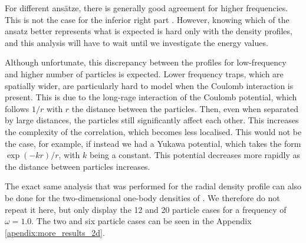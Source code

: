 For different ansätze, there is generally good agreement for higher frequencies. This is not the case for the inferior right part . However, knowing which of the ansatz better represents what is expected is hard only with the density profiles, and this analysis will have to wait until we investigate the energy values.

Although unfortunate, this discrepancy between the profiles for low-frequency and higher number of particles is expected. Lower frequency traps, which are spatially wider, are particularly hard to model when the Coulomb interaction is present. This is due to the long-rage interaction of the Coulomb potential, which follows $1/r$ with $r$ the distance between the particles. Then, even when separated by large distances, the particles still significantly affect each other. This increases the complexity of the correlation, which becomes less localised. This would not be the case, for example, if instead we had a Yukawa potential, which takes the form $\exp(-kr)/r$, with $k$ being a constant. This potential decreases more rapidly as the distance between particles increases.

The exact same analysis that was performed for the radial density profile can also be done for the two-dimensional one-body densities of . We therefore do not repeat it here, but only display the 12 and 20 particle cases for a frequency of $\omega = 1.0$. The two and six particle cases can be seen in the Appendix \ref{apendix:more_results_2d}.

